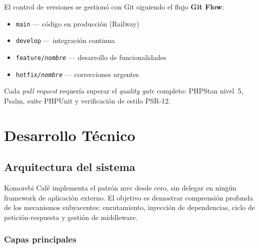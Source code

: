 \documentclass[12pt,a4paper,twoside,openright]{report}
\begin{document}
El control de versiones se gestionó con Git siguiendo el flujo \textbf{Git Flow}:
\begin{itemize}[nosep]
  \item \texttt{main} — código en producción (Railway)
  \item \texttt{develop} — integración continua
  \item \texttt{feature/\textit{nombre}} — desarrollo de funcionalidades
  \item \texttt{hotfix/\textit{nombre}} — correcciones urgentes
\end{itemize}

Cada \textit{pull request} requería superar el \textit{quality gate} completo:
PHPStan nivel~5, Psalm, suite PHPUnit y verificación de estilo PSR-12.

\chapter{Desarrollo Técnico}
\label{chap:tecnico}

\section{Arquitectura del sistema}
\label{sec:arquitectura}

Komorebi Café implementa el patrón \gls{mvc} desde cero, sin delegar en ningún
framework de aplicación externo. El objetivo es demostrar comprensión profunda de los
mecanismos subyacentes: enrutamiento, inyección de dependencias, ciclo de
petición-respuesta y gestión de middleware.

\subsection{Capas principales}
\end{document}
